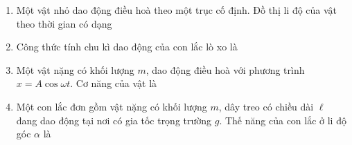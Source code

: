 \begin{enumerate}[label=\bfseries Câu \arabic*:]
\item Một vật nhỏ dao động điều hoà theo một trục cố định. Đồ thị li độ của vật theo thời gian có dạng 

\item Công thức tính chu kì dao động của con lắc lò xo là

\item Một vật nặng có khối lượng $m$, dao động điều hoà với phương trình $x=A\cos\omega t$. Cơ năng của vật là

\item Một con lắc đơn gồm vật nặng có khối lượng $m$, dây treo có chiều dài $\ell$ đang dao động tại nơi có gia tốc trọng trường $g$. Thế năng của con lắc ở li độ góc $\alpha$ là


\end{enumerate}
